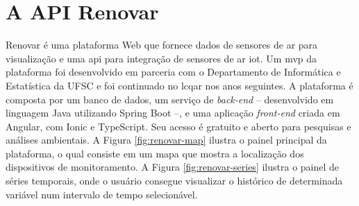 \section{A API Renovar}

Renovar é uma plataforma Web que fornece dados de sensores de ar para visualização e uma \acrshort{api} para integração de sensores de ar \acrshort{iot}. Um \acrshort{mvp} da plataforma foi desenvolvido em parceria com o Departamento de Informática e Estatística da UFSC \cite{Teixeira2018} e foi continuado no \acrshort{lcqar} nos anos seguintes. A plataforma é composta por um banco de dados, um serviço de \textit{back-end} – desenvolvido em linguagem Java utilizando Spring Boot –, e uma aplicação \textit{front-end} criada em Angular, com Ionic e TypeScript. Seu acesso é gratuito e aberto para pesquisas e análises ambientais. A Figura \ref{fig:renovar-map} ilustra o painel principal da plataforma, o qual consiste em um mapa que mostra a localização dos dispositivos de monitoramento. A Figura \ref{fig:renovar-series} ilustra o painel de séries temporais, onde o usuário consegue visualizar o histórico de determinada variável num intervalo de tempo selecionável.

